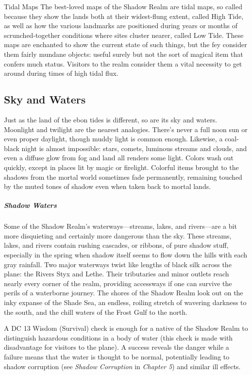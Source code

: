 \documentclass[10pt,a4paper,twoside,bg=print,twocolumn,openany,nodeprecatedcode]{dndbook}
\begin{document}
\begin{DndSidebar}[float=!b]{Tidal Maps}
The best-loved maps of the Shadow Realm are tidal maps, so called because they show the lands both at their widest-flung extent, called High Tide, as well as how the various landmarks are positioned during years or months of scrunched-together conditions where sites cluster nearer, called Low Tide. These maps are enchanted to show the current state of such things, but the fey consider them fairly mundane objects: useful surely but not the sort of magical item that confers much status. Visitors to the realm consider them a vital necessity to get around during times of high tidal flux.



\end{DndSidebar}

\subsection{Sky and Waters}
Just as the land of the ebon tides is different, so are its sky and waters. Moonlight and twilight are the nearest analogies. There's never a full noon sun or even proper daylight, though muddy light is common enough. Likewise, a coal-black night is almost impossible: stars, comets, luminous streams and clouds, and even a diffuse glow from fog and land all renders some light. Colors wash out quickly, except in places lit by magic or firelight. Colorful items brought to the shadows from the mortal world sometimes fade permanently, remaining touched by the muted tones of shadow even when taken back to mortal lands.

\subparagraph{Shadow Waters}
Some of the Shadow Realm's waterways—streams, lakes, and rivers—are a bit more disquieting and certainly more dangerous than the sky. These streams, lakes, and rivers contain rushing cascades, or ribbons, of pure shadow stuff, especially in the spring when shadow itself seems to flow down the hills with each gray rainfall. Two major waterways twist like lengths of black silk across the plane: the Rivers Styx and Lethe. Their tributaries and minor outlets reach nearly every corner of the realm, providing accessways if one can survive the perils of a waterborne journey. The shores of the Shadow Realm look out on the inky expanse of the Shade Sea, an endless, roiling stretch of wavering darkness to the south, and the chill waters of the Frost Gulf to the north.

A DC 13 Wisdom (Survival) check is enough for a native of the Shadow Realm to distinguish hazardous conditions in a body of water (this check is made with disadvantage for visitors to the plane). A success reveals the danger while a failure means that the water is thought to be normal, potentially leading to shadow corruption (see \textit{Shadow Corruption} in \textit{Chapter 5}) and similar ill effects.
\end{document}
